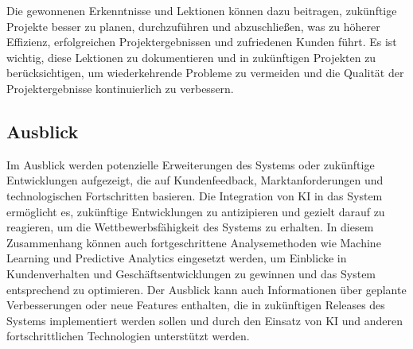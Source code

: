 \begin{flushleft}
			Die gewonnenen Erkenntnisse und Lektionen können dazu beitragen, zukünftige Projekte besser zu planen, durchzuführen und abzuschließen, was zu höherer Effizienz, erfolgreichen Projektergebnissen und zufriedenen Kunden führt. Es ist wichtig, diese Lektionen zu dokumentieren und in zukünftigen Projekten zu berücksichtigen, um wiederkehrende Probleme zu vermeiden und die Qualität der Projektergebnisse kontinuierlich zu verbessern.


		\subsection{Ausblick}
			Im Ausblick werden potenzielle Erweiterungen des Systems oder zukünftige Entwicklungen aufgezeigt,
			die auf Kundenfeedback, Marktanforderungen und technologischen Fortschritten basieren.
			Die Integration von \acs{KI} in das System ermöglicht es,
			zukünftige Entwicklungen zu antizipieren und gezielt darauf zu reagieren, um die Wettbewerbsfähigkeit des Systems zu erhalten.
			In diesem Zusammenhang können auch fortgeschrittene Analysemethoden wie Machine Learning und Predictive Analytics eingesetzt werden,
			um Einblicke in Kundenverhalten und Geschäftsentwicklungen zu gewinnen und das System entsprechend zu optimieren.
			Der Ausblick kann auch Informationen über geplante Verbesserungen oder neue Features enthalten,
			die in zukünftigen Releases des Systems implementiert werden sollen und durch den Einsatz von \acs{KI} und anderen fortschrittlichen Technologien unterstützt werden.




	\end{flushleft}

